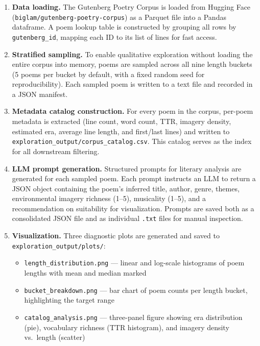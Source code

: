\documentclass[11pt,a4paper]{article}
\begin{document}
\begin{enumerate}
  \item \textbf{Data loading.} The Gutenberg Poetry Corpus is loaded from Hugging Face (\texttt{biglam/gutenberg-poetry-corpus}) as a Parquet file into a Pandas dataframe. A poem lookup table is constructed by grouping all rows by \texttt{gutenberg\_id}, mapping each ID to its list of lines for fast access.

  \item \textbf{Stratified sampling.} To enable qualitative exploration without loading the entire corpus into memory, poems are sampled across all nine length buckets (5 poems per bucket by default, with a fixed random seed for reproducibility). Each sampled poem is written to a text file and recorded in a JSON manifest.

  \item \textbf{Metadata catalog construction.} For every poem in the corpus, per-poem metadata is extracted (line count, word count, TTR, imagery density, estimated era, average line length, and first/last lines) and written to \texttt{exploration\_output/corpus\_catalog.csv}. This catalog serves as the index for all downstream filtering.

  \item \textbf{LLM prompt generation.} Structured prompts for literary analysis are generated for each sampled poem. Each prompt instructs an LLM to return a JSON object containing the poem's inferred title, author, genre, themes, environmental imagery richness (1--5), musicality (1--5), and a recommendation on suitability for visualization. Prompts are saved both as a consolidated JSON file and as individual \texttt{.txt} files for manual inspection.

  \item \textbf{Visualization.} Three diagnostic plots are generated and saved to \texttt{exploration\_output/plots/}:
  \begin{itemize}
    \item \texttt{length\_distribution.png} — linear and log-scale histograms of poem lengths with mean and median marked
    \item \texttt{bucket\_breakdown.png} — bar chart of poem counts per length bucket, highlighting the target range
    \item \texttt{catalog\_analysis.png} — three-panel figure showing era distribution (pie), vocabulary richness (TTR histogram), and imagery density vs.\ length (scatter)
  \end{itemize}


\end{enumerate}
\end{document}
